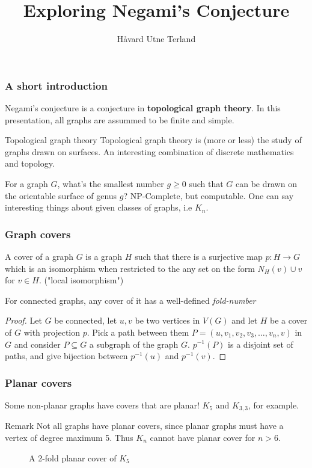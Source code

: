 \documentclass{beamer}
\title{Exploring Negami's Conjecture}
\author{Håvard Utne Terland}
\begin{document}
	
	\frame{\titlepage}
	
	\begin{frame}
	\frametitle{A short introduction}
	Negami's conjecture is a conjecture in \textbf{topological graph theory}. In this presentation, all graphs are assummed to be finite and simple.
	
	\begin{block}{Topological graph theory}
		Topological graph theory is (more or less) the study of graphs drawn on surfaces. An interesting combination of discrete mathematics and topology.
	\end{block}

	\begin{example}
		For a graph $G$, what's the smallest number $g \geq 0$ such that $G$ can be drawn on the orientable surface of genus $g$? NP-Complete, but computable. One can say interesting things about given classes of graphs, i.e $K_n$.
	\end{example}
	
\end{frame}

\begin{frame}
\frametitle{Graph covers}
\begin{definition}
	A cover of a graph $G$ is a graph $H$ such that there is a surjective map $p:H \rightarrow G$ which is an isomorphism when restricted to the any set on the form $N_{H}(v) \cup {v}$ for $v \in H$. ("local isomorphism")
\end{definition}
\begin{theorem}
	For connected graphs, any cover of it has a well-defined \textit{fold-number}
\end{theorem}

\begin{proof}{}
	Let $G$ be connected, let $u,v$ be two vertices in $V(G)$ and let $H$ be a cover of $G$ with projection $p$. Pick a path between them $P = (u,v_1,v_2,v_3,\dots,v_n,v)$ in $G$ and consider $P \subseteq G$ a subgraph of the graph $G$. $p^{-1}(P)$ is a disjoint set of paths, and give bijection between $p^{-1}(u)$ and $p^{-1}(v)$. 
\end{proof}

\end{frame}

\begin{frame}

\frametitle{Planar covers}
Some non-planar graphs have covers that are planar! $K_5$ and $K_{3,3}$, for example.

\begin{block}{Remark}
	Not all graphs have planar covers, since planar graphs must have a vertex of degree maximum 5. Thus $K_n$ cannot have planar cover for $n > 6$.
\end{block}


\begin{figure}[h]
	
	\caption{A 2-fold planar cover of $K_5$}	
\end{figure}

\end{frame}
\end{document}
